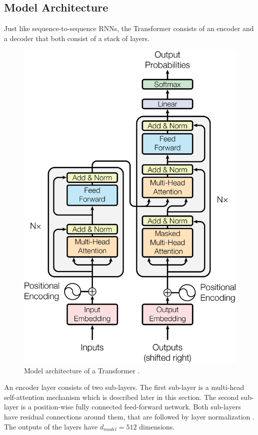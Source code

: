 \subsection{Model Architecture}

Just like sequence-to-sequence RNNs, the Transformer consists of an encoder and a decoder that both consist of a stack of layers.

\begin{figure}[h]
\centering
\includegraphics{figures/transformer-model}
\caption[Model architecture of a Transformer]{Model architecture of a Transformer \cite[p.~~3]{1706.03762}.}
\label{fig:transformer-model}
\end{figure}

An encoder layer consists of two sub-layers.
The first sub-layer is a multi-head self-attention mechanism which is described later in this section.
The second sub-layer is a position-wise fully connected feed-forward network.
Both sub-layers have residual connections \cite{1512.03385} around them, that are followed by layer normalization \cite{1607.06450}.
The outputs of the layers have $d_{model}=512$ dimensions.

